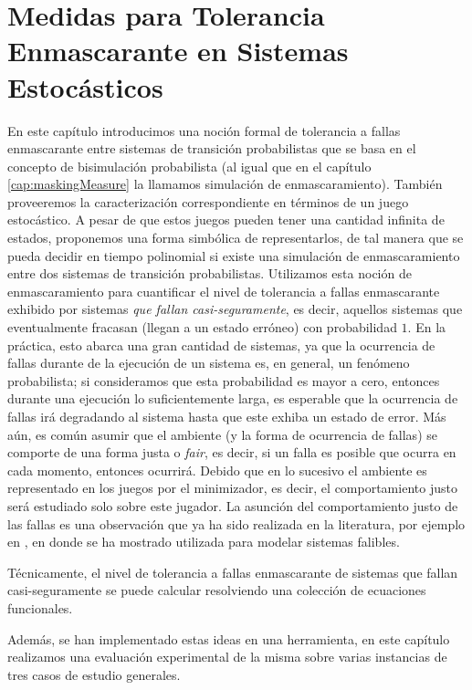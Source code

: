 \chapter{Medidas para Tolerancia Enmascarante en Sistemas Estocásticos}
\label{cap:maskProb}

En este capítulo introducimos una noción formal de tolerancia a fallas enmascarante entre sistemas de transición probabilistas que se basa en el concepto de bisimulación probabilista (al igual que en el capítulo \ref{cap:maskingMeasure} la llamamos simulación de enmascaramiento). También proveeremos la caracterización correspondiente en términos de un juego estocástico. A pesar de que estos juegos pueden tener una cantidad infinita de estados, proponemos una forma simbólica de representarlos, de tal manera que se pueda decidir en tiempo polinomial si existe una simulación de enmascaramiento entre dos sistemas de transición probabilistas.
%
Utilizamos esta noción de enmascaramiento para cuantificar el nivel de tolerancia a fallas enmascarante exhibido por sistemas \emph{que fallan casi-seguramente}, es decir, aquellos sistemas que eventualmente fracasan (llegan a un estado erróneo) con probabilidad $1$. En la práctica, esto abarca una gran cantidad de sistemas, ya que la ocurrencia de fallas durante de la ejecución de un sistema es, en general, un fenómeno probabilista; si consideramos que esta probabilidad es mayor a cero, entonces durante una ejecución lo suficientemente larga, es esperable que la  ocurrencia de fallas irá degradando al sistema hasta que este exhiba un estado de error. Más aún, es común asumir que el ambiente (y la forma de ocurrencia de fallas) se comporte de una forma justa o \emph{fair}, es decir, si un falla es posible que ocurra en cada momento, entonces ocurrirá. Debido que en lo sucesivo el ambiente es representado en los juegos por el minimizador, es decir, el comportamiento justo será estudiado solo sobre este jugador.
La asunción del comportamiento justo de las fallas es una observación que ya ha sido realizada en la literatura, por ejemplo en \cite{DBLP:conf/icse/DIppolitoBPU11}, en donde se ha mostrado utilizada para modelar sistemas falibles.

Técnicamente, el nivel de tolerancia a fallas enmascarante de sistemas que fallan casi-seguramente se puede calcular resolviendo una colección de ecuaciones funcionales.
%

Además, se han implementado estas ideas en una herramienta, en este capítulo  realizamos una evaluación experimental de la misma  sobre varias instancias de tres casos de estudio generales.






